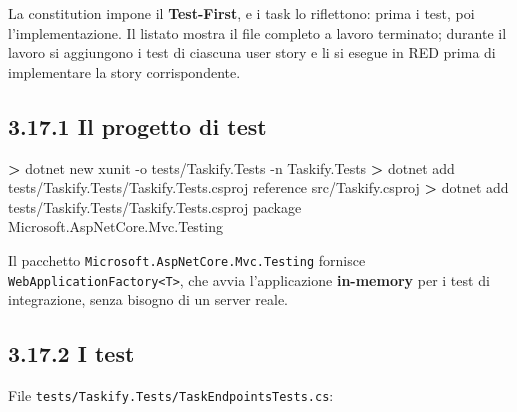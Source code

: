 \documentclass[
  italian,
  10pt,
]{book}
\newenvironment{Shaded}{\begin{snugshade}}{\end{snugshade}}
\newcommand{\AttributeTok}[1]{\textcolor[rgb]{0.13,0.29,0.53}{#1}}
\newcommand{\ExtensionTok}[1]{#1}
\newcommand{\NormalTok}[1]{#1}
\newcommand{\OperatorTok}[1]{\textcolor[rgb]{0.81,0.36,0.00}{\textbf{#1}}}
\begin{document}
La constitution impone il \textbf{Test-First}, e i task lo riflettono:
prima i test, poi l'implementazione. Il listato mostra il file completo
a lavoro terminato; durante il lavoro si aggiungono i test di ciascuna
user story e li si esegue in RED prima di implementare la story
corrispondente.

\subsection{3.17.1 Il progetto di test}\label{il-progetto-di-test}

\begin{Shaded}
\begin{Highlighting}[]
\OperatorTok{\textgreater{}}\NormalTok{ dotnet }\ExtensionTok{new}\NormalTok{ xunit }\AttributeTok{{-}o}\NormalTok{ tests/Taskify.Tests }\AttributeTok{{-}n}\NormalTok{ Taskify.Tests}
\OperatorTok{\textgreater{}}\NormalTok{ dotnet }\ExtensionTok{add}\NormalTok{ tests/Taskify.Tests/Taskify.Tests.csproj reference src/Taskify.csproj}
\OperatorTok{\textgreater{}}\NormalTok{ dotnet }\ExtensionTok{add}\NormalTok{ tests/Taskify.Tests/Taskify.Tests.csproj package Microsoft.AspNetCore.Mvc.Testing}
\end{Highlighting}
\end{Shaded}

Il pacchetto \texttt{Microsoft.AspNetCore.Mvc.Testing} fornisce
\texttt{WebApplicationFactory\textless{}T\textgreater{}}, che avvia
l'applicazione \textbf{in-memory} per i test di integrazione, senza
bisogno di un server reale.

\subsection{3.17.2 I test}\label{i-test}

File \texttt{tests/Taskify.Tests/TaskEndpointsTests.cs}:
\end{document}
